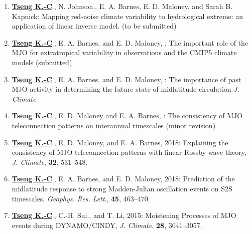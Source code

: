 \documentclass{article}
\begin{document}
\begin{enumerate}
	\item \normalsize{\bf{\underline{Tseng K.-C}}}., N. Johnson., E. A. Barnes, E. D. Maloney, and Sarah B. Kapnick: Mapping red-noise climate variability to hydrological extreme: an application of linear inverse model. (to be submitted)  
	\item \normalsize{\bf{\underline{Tseng K.-C}}}., E. A. Barnes, and E. D. Maloney, : The important role of the MJO for extratropical variability in observations and the CMIP5 climate models (submitted)  
	\item \normalsize{\bf{\underline{Tseng K.-C}}}., E. A. Barnes, and E. D. Maloney, : The importance of past MJO activity in determining the future state of midlatitude circulation  \textit{J. Climate} 
	\item \normalsize{\bf{\underline{Tseng K.-C}}}., E. D. Maloney and E. A. Barnes, : The consistency of MJO teleconnection patterns on interannual timescales (minor revision) 
	\item \normalsize{\bf{\underline{Tseng K.-C}}}., E. D. Maloney, and E. A. Barnes, 2018: Explaining the consistency of MJO teleconnection patterns with linear Rossby wave theory, \textit{J. Climate}, \normalsize{\bf{32}}, 531--548.
	\item \normalsize{\bf{\underline{Tseng K.-C}}}., E. A. Barnes, and E. D. Maloney, 2018: Prediction of the midlatitude response to strong Madden-Julian oscillation events on S2S timescales, \textit{Geophys. Res. Lett}., \normalsize{\bf{45}}, 463--470. \par
	\item \normalsize{\bf{\underline{Tseng K.-C}}}., C.-H. Sui., and T. Li, 2015: Moistening Processes of MJO events during DYNAMO/CINDY, \textit{J. Climate}, \normalsize{\bf{28}}, 3041--3057.
    \end{enumerate}
\end{document}
